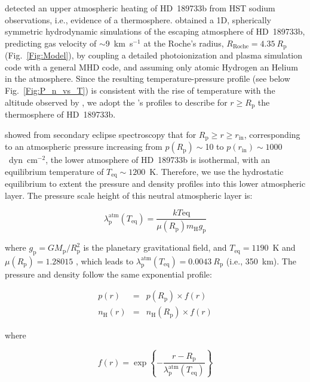 \documentclass[iop]{emulateapj}
\begin{document}
\citet{Huitson2012} detected an upper atmospheric heating of HD~189733b from HST sodium observations, i.e., evidence of a 
thermosphere. \citet{Salz2015} obtained a 1D, spherically symmetric hydrodynamic simulations of the escaping atmosphere of HD~189733b, 
predicting gas velocity of $\sim$9~km~s$^{-1}$ at the Roche's radius, $R_\mathrm{Roche}=4.35~R_\mathrm{p}$ (Fig.~\ref{Fig:Model}), 
{by coupling a detailed photoionization and plasma simulation code with a general MHD code, and assuming only atomic Hydrogen an Helium 
in the atmosphere}. Since the resulting temperature-pressure profile (see below Fig.~\ref{Fig:P_n_vs_T}) is consistent with the rise 
of temperature with the altitude observed by \citet{Huitson2012}, we adopt the \citet{Salz2015}'s profiles to describe 
for $r \geq R_\mathrm{p}$ the thermosphere of HD~189733b.

\citet{Line2014} showed from secondary eclipse spectroscopy that for $R_\mathrm{p} \geq r \geq r_\mathrm{in}$, 
corresponding to an atmospheric pressure increasing from $p(R_\mathrm{p})\sim$10 to $p(r_\mathrm{in})\sim1000$~dyn~cm$^{-2}$, 
the lower atmosphere of HD~189733b is isothermal, with an equilibrium temperature of $T_\mathrm{eq}\sim1200$~K. Therefore, we 
use the hydrostatic equilibrium to extent the pressure and density profiles into this lower atmospheric layer. The pressure scale 
height of this neutral atmospheric layer is:

\begin{equation}
\lambda_\mathrm{p}^\mathrm{atm}(T_\mathrm{eq})=\frac{kT\mathrm{eq}}{\mu(R_\mathrm{p}) 
m_\mathrm{H} g_\mathrm{p}}
\end{equation}

where $g_\mathrm{p}=GM_\mathrm{p}/R_\mathrm{p}^2$ is the planetary gravitational field, and $T_\mathrm{eq}=1190$~K and 
$\mu(R_\mathrm{p})=1.28015$ \citep{Salz2016}, which leads to $\lambda_\mathrm{p}^\mathrm{atm}(T_\mathrm{eq})=0.0043~R_\mathrm{p}$ 
(i.e., 350~km). The pressure and density follow the same exponential profile:

\begin{eqnarray}
  p(r) 			& = & p(R_\mathrm{p})\times f(r)\\
  n_\mathrm{H}(r) 	& = & n_\mathrm{H}(R_\mathrm{p})\times f(r)
\end{eqnarray}

where

\begin{equation}
  f(r)=\exp{\!\left\{-\frac{r-R_\mathrm{p}}
  {\lambda_\mathrm{p}^\mathrm{atm}(T_\mathrm{eq})}\right\}}
\end{equation}
\end{document}
